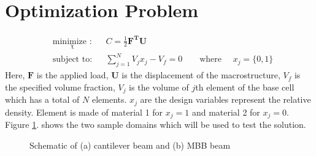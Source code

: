\documentclass[openright,twoside]{iitkthesis}
\begin{document}
\section{Optimization Problem}
\begin{equation}
\label{eq:2dopt}
\begin{aligned}
& \underset{\chi}{\text{minimize :}}
& &  C = \frac{1}{2}\textbf{F}^\textbf{T}\textbf{U}\\
& \text{subject to:}
& & \sum_{j=1}^N V_j x_j - V_f = 0 \qquad \text{where }\quad x_j = \{0, 1\}
\end{aligned}
\end{equation}
Here, $\textbf{F}$ is the applied load, $\textbf{U}$ is the displacement of the macrostructure, $V_f$ is the specified volume fraction, $V_j$ is the volume of $j$th element of the base cell which has a total of $N$ elements. $x_j$ are the design variables represent the relative density. Element is made of material 1 for $x_j=1$ and material 2 for $x_j=0$. Figure \ref{fig:cantilever}. shows the two sample domains which will be used to test the solution.

\cite{huang2013topology}
\begin{figure}[H]
\begin{center}
\caption{Schematic of (a) cantilever beam and (b) MBB beam}
\label{fig:cantilever}
\end{center}
\end{figure}
\end{document}
